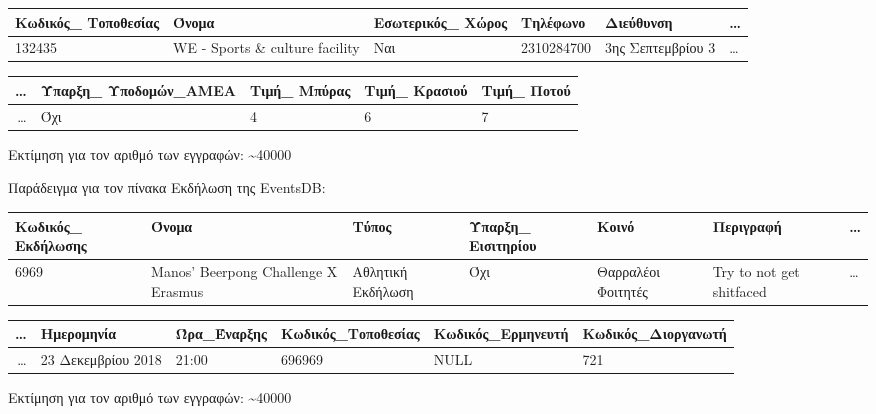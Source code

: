 \begin{table}[H]
  \centering
  \footnotesize
  \begin{tabular}{|p{1.8cm}|p{2cm}|p{1.6cm}|p{1.6cm}|p{2.5cm}|l}
  \hline
  Κωδικός\_ Τοποθεσίας & Όνομα & Εσωτερικός\_ Χώρος & Τηλέφωνο & Διεύθυνση
    & \ldots \\ \hline
  132435 & WE - Sports \& culture facility & Ναι & 2310284700 & 3ης Σεπτεμβρίου 3 & \ldots \\ \hline
  \end{tabular}
  \begin{tabular}{r|p{2cm}|p{2cm}|p{2cm}|p{2cm}|}
  \hline
    \ldots & Ύπαρξη\_ Υποδομών\_ΑΜΕΑ & Τιμή\_ Μπύρας & Τιμή\_ Κρασιού
    & Τιμή\_ Ποτού \\ \hline
    \ldots & Όχι & 4 & 6 & 7 \\ \hline
\end{tabular}
\end{table}
  
Εκτίμηση για τον αριθμό των εγγραφών: \textasciitilde 40000

Παράδειγμα για τον πίνακα Εκδήλωση της EventsDB:

\begin{table}[H]
  \centering
  \footnotesize
  \begin{tabular}{|p{1.6cm}|p{2.8cm}|p{2cm}|p{1.5cm}|l|l|l}
  \hline
  Κωδικός\_ Εκδήλωσης & Όνομα                               & Τύπος
    & Ύπαρξη\_ Εισιτηρίου & Κοινό              & Περιγραφή & \ldots \\ \hline
  6969               & Manos' Beerpong Challenge X Erasmus & Αθλητική
                                                             Εκδήλωση
    & Όχι                & Θαρραλέοι Φοιτητές & Try to not get
                                                shitfaced & \ldots  \\ \hline
  \end{tabular}
   \begin{tabular}{r|l|l|l|l|l|}
  \hline
  \ldots & Ημερομηνία         & Ώρα\_Έναρξης & Κωδικός\_Τοποθεσίας & Κωδικός\_Ερμηνευτή & Κωδικός\_Διοργανωτή \\ \hline
  \ldots & 23 Δεκεμβρίου 2018 & 21:00        & 696969              & NULL               & 721                 \\ \hline
\end{tabular}
\end{table}
  
Εκτίμηση για τον αριθμό των εγγραφών: \textasciitilde 40000

